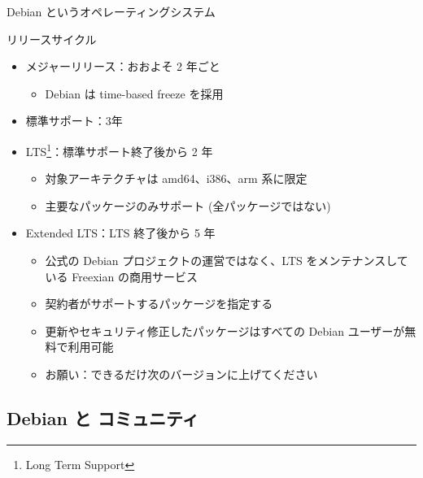 \begin{frame}{Debian というオペレーティングシステム}

リリースサイクル

\begin{itemize}
\item メジャーリリース：おおよそ 2 年ごと
  \begin{itemize}
  \item Debian は time-based freeze を採用
  \end{itemize}
\item 標準サポート：3年
\item LTS\footnote{Long Term Support}：標準サポート終了後から 2 年
  \begin{itemize}
  \item 対象アーキテクチャは amd64、i386、arm 系に限定
  \item 主要なパッケージのみサポート (全パッケージではない)
  \end{itemize}
\item Extended LTS：LTS 終了後から 5 年
  \begin{itemize}
  \item 公式の Debian プロジェクトの運営ではなく、LTS をメンテナンスしている Freexian の商用サービス
  \item 契約者がサポートするパッケージを指定する
  \item 更新やセキュリティ修正したパッケージはすべての Debian ユーザーが無料で利用可能
  \item お願い：できるだけ次のバージョンに上げてください
  \end{itemize}
\end{itemize}

\end{frame}


\subsection{Debian と コミュニティ}



